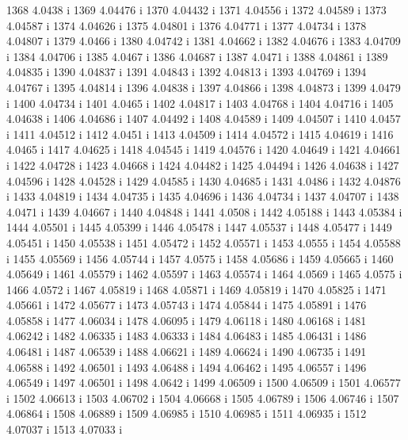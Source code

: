 1368  4.0438  i
 1369  4.04476  i
 1370  4.04432  i
 1371  4.04556  i
 1372  4.04589  i
 1373  4.04587  i
 1374  4.04626  i
 1375  4.04801  i
 1376  4.04771  i
 1377  4.04734  i
 1378  4.04807  i
 1379  4.0466  i
 1380  4.04742  i
 1381  4.04662  i
 1382  4.04676  i
 1383  4.04709  i
 1384  4.04706  i
 1385  4.0467  i
 1386  4.04687  i
 1387  4.0471  i
 1388  4.04861  i
 1389  4.04835  i
 1390  4.04837  i
 1391  4.04843  i
 1392  4.04813  i
 1393  4.04769  i
 1394  4.04767  i
 1395  4.04814  i
 1396  4.04838  i
 1397  4.04866  i
 1398  4.04873  i
 1399  4.0479  i
 1400  4.04734  i
 1401  4.0465  i
 1402  4.04817  i
 1403  4.04768  i
 1404  4.04716  i
 1405  4.04638  i
 1406  4.04686  i
 1407  4.04492  i
 1408  4.04589  i
 1409  4.04507  i
 1410  4.0457  i
 1411  4.04512  i
 1412  4.0451  i
 1413  4.04509  i
 1414  4.04572  i
 1415  4.04619  i
 1416  4.0465  i
 1417  4.04625  i
 1418  4.04545  i
 1419  4.04576  i
 1420  4.04649  i
 1421  4.04661  i
 1422  4.04728  i
 1423  4.04668  i
 1424  4.04482  i
 1425  4.04494  i
 1426  4.04638  i
 1427  4.04596  i
 1428  4.04528  i
 1429  4.04585  i
 1430  4.04685  i
 1431  4.0486  i
 1432  4.04876  i
 1433  4.04819  i
 1434  4.04735  i
 1435  4.04696  i
 1436  4.04734  i
 1437  4.04707  i
 1438  4.0471  i
 1439  4.04667  i
 1440  4.04848  i
 1441  4.0508  i
 1442  4.05188  i
 1443  4.05384  i
 1444  4.05501  i
 1445  4.05399  i
 1446  4.05478  i
 1447  4.05537  i
 1448  4.05477  i
 1449  4.05451  i
 1450  4.05538  i
 1451  4.05472  i
 1452  4.05571  i
 1453  4.0555  i
 1454  4.05588  i
 1455  4.05569  i
 1456  4.05744  i
 1457  4.0575  i
 1458  4.05686  i
 1459  4.05665  i
 1460  4.05649  i
 1461  4.05579  i
 1462  4.05597  i
 1463  4.05574  i
 1464  4.0569  i
 1465  4.0575  i
 1466  4.0572  i
 1467  4.05819  i
 1468  4.05871  i
 1469  4.05819  i
 1470  4.05825  i
 1471  4.05661  i
 1472  4.05677  i
 1473  4.05743  i
 1474  4.05844  i
 1475  4.05891  i
 1476  4.05858  i
 1477  4.06034  i
 1478  4.06095  i
 1479  4.06118  i
 1480  4.06168  i
 1481  4.06242  i
 1482  4.06335  i
 1483  4.06333  i
 1484  4.06483  i
 1485  4.06431  i
 1486  4.06481  i
 1487  4.06539  i
 1488  4.06621  i
 1489  4.06624  i
 1490  4.06735  i
 1491  4.06588  i
 1492  4.06501  i
 1493  4.06488  i
 1494  4.06462  i
 1495  4.06557  i
 1496  4.06549  i
 1497  4.06501  i
 1498  4.0642  i
 1499  4.06509  i
 1500  4.06509  i
 1501  4.06577  i
 1502  4.06613  i
 1503  4.06702  i
 1504  4.06668  i
 1505  4.06789  i
 1506  4.06746  i
 1507  4.06864  i
 1508  4.06889  i
 1509  4.06985  i
 1510  4.06985  i
 1511  4.06935  i
 1512  4.07037  i
 1513  4.07033  i
